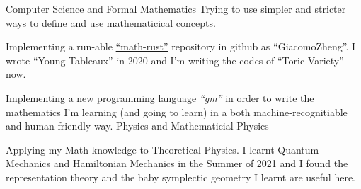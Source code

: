 \resumeSubHeadingListStart
	\resumeSubheading
		{Computer Science and Formal Mathematics}{}
		{Trying to use simpler and stricter ways to define and use mathematicical concepts.}{}
		\resumeItemListStart
			\item Implementing a run-able \href{https://github.com/GiacomoZheng/math-rust}{``math-rust''} repository in github as ``GiacomoZheng''. I wrote ``Young Tableaux'' in 2020 and I'm writing the codes of ``Toric Variety'' now.
			\item Implementing a new programming language \href{https://github.com/GiacomoZheng/gm}{\textit{``gm''}} in order to write the mathematics I'm learning (and going to learn) in a both machine-recognitiable and human-friendly way.
		\resumeItemListEnd
	\resumeSubheadingPlain
		{Physics and Mathematicial Physics}{}
		\resumeItemListStart
			\item Applying my Math knowledge to Theoretical Physics. I learnt Quantum Mechanics and Hamiltonian Mechanics in the Summer of 2021 and I found the representation theory and the baby symplectic geometry I learnt are useful here.
		\resumeItemListEnd
\resumeSubHeadingListEnd

